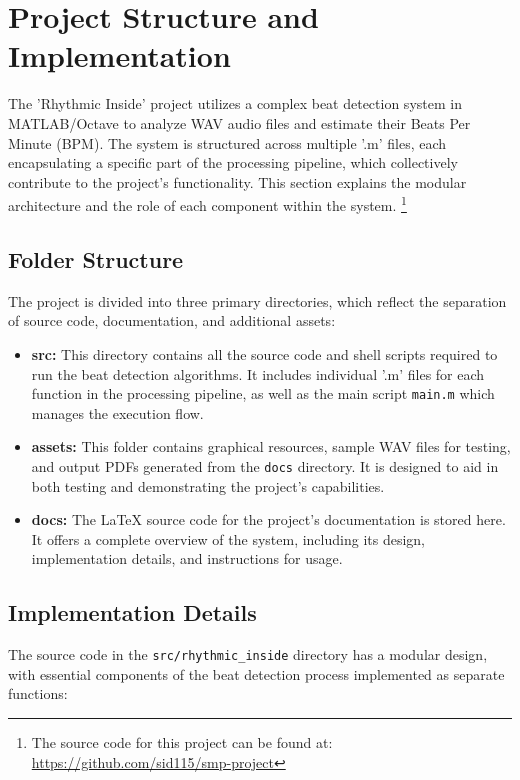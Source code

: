 \section{Project Structure and Implementation}

The 'Rhythmic Inside' project utilizes a complex beat detection system in MATLAB/Octave to analyze WAV audio files and estimate their Beats Per Minute (BPM). The system is structured across multiple '.m' files, each encapsulating a specific part of the processing pipeline, which collectively contribute to the project's functionality. This section explains the modular architecture and the role of each component within the system. \footnote{The source code for this project can be found at: \url{https://github.com/sid115/smp-project}}

\subsection{Folder Structure}
The project is divided into three primary directories, which reflect the separation of source code, documentation, and additional assets:
\begin{itemize}
    \item \textbf{src:} This directory contains all the source code and shell scripts required to run the beat detection algorithms. It includes individual '.m' files for each function in the processing pipeline, as well as the main script \texttt{main.m} which manages the execution flow.
    \item \textbf{assets:} This folder contains graphical resources, sample WAV files for testing, and output PDFs generated from the \texttt{docs} directory. It is designed to aid in both testing and demonstrating the project's capabilities.
    \item \textbf{docs:} The LaTeX source code for the project's documentation is stored here. It offers a complete overview of the system, including its design, implementation details, and instructions for usage.
\end{itemize}

\subsection{Implementation Details}
The source code in the \texttt{src/rhythmic\_inside} directory has a modular design, with essential components of the beat detection process implemented as separate functions:


